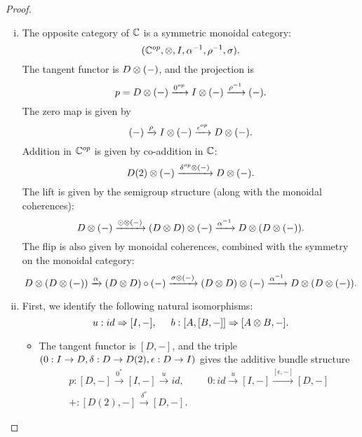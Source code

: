 \begin{proof}
   ~\begin{enumerate}[(i)]
        \item The opposite category of $\mathbb{C}$ is a symmetric monoidal category:
        \[
            (\mathbb{C}^{op}, \otimes, I, \alpha^{-1}, \rho^{-1}, \sigma).
        \]
        The tangent functor is $D \otimes (-)$, and the projection is \[p = D \otimes (-) \xrightarrow[]{0^{op}} I \otimes (-) \xrightarrow[]{\rho^{-1}} (-).\] The zero map is given by
        \[
            (-) \xrightarrow[]{\rho} I \otimes (-) \xrightarrow[]{\epsilon^{op}} D \otimes (-).
        \]
        Addition in $\mathbb{C}^{op}$ is given by co-addition in $\mathbb{C}$:
        \[
            D(2) \otimes (-) \xrightarrow[]{\delta^{op} \otimes (-)} D \otimes (-). 
        \]
        The lift is given by the semigroup structure (along with the monoidal coherences):
        \[
            D \otimes (-) \xrightarrow[]{\odot \otimes (-)} (D \otimes D) \otimes (-) \xrightarrow[]{\alpha^{-1}} D \otimes (D \otimes (-)).
        \]
        The flip is also given by monoidal coherences, combined with the symmetry on the monoidal category:
        \[
            D \otimes (D \otimes (-))  \xrightarrow[]{\alpha} (D \otimes D) \circ (-) \xrightarrow[]{\sigma \otimes (-)}
            (D \otimes D) \otimes (-) \xrightarrow[]{\alpha^{-1}} D \otimes (D \otimes (-)).
        \]
      \item First, we identify the following natural isomorphisms:
        \[
            u: id \Rightarrow [I,-],\hspace{0.5cm}
            b: [A,[B,-]] \Rightarrow [A \otimes B, -].
        \]
        \begin{itemize}
            \item The tangent functor is $[D,-]$, and the triple $(0:I \to D, \delta:D \to D(2), \linebreak \epsilon:D \to I)$ gives the additive bundle structure
            \begin{gather*}
                p:[D,-] \xrightarrow{0^*} [I,-] \xrightarrow{u} id, \hspace{1cm}
                0: id \xrightarrow{u} [I,-] \xrightarrow{[\epsilon, -]} [D,-] \\
                +:[D(2),-] \xrightarrow{\delta^*} [D,-].
            \end{gather*}
    

\end{itemize}
\end{enumerate}
\end{proof}
